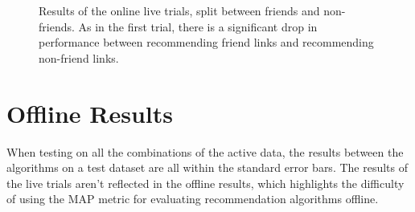 \begin{figure}[h!]
\caption{Results of the online live trials, split between friends and non-friends. As in the first trial, there is a significant drop in performance between recommending friend links and recommending non-friend links.}
\label{fig:OnlineFriend2}
\end{figure}

\section{Offline Results}

When testing on all the combinations of the active data, the results between the algorithms on a test dataset are all within the standard error bars. The results of the live trials aren't reflected in the offline results, which highlights the difficulty of using the MAP metric for evaluating recommendation algorithms offline.


